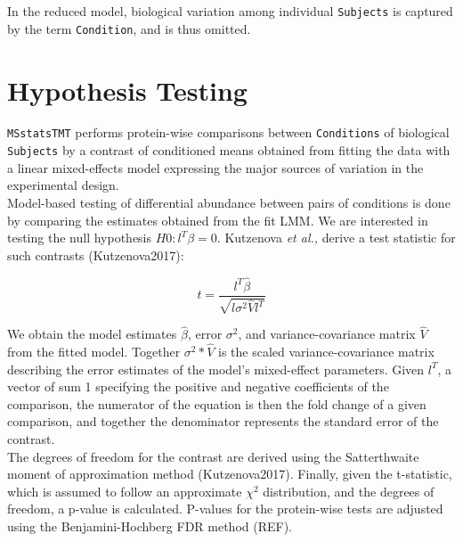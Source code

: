 \documentclass[11pt]{elife}\usepackage[]{graphicx}\usepackage[]{color}
\begin{document}
In the reduced model, biological variation among individual \texttt{Subjects} is 
captured by the term \texttt{Condition}, and is thus omitted.\\


\section{Hypothesis Testing}

\texttt{MSstatsTMT} performs protein-wise
comparisons between \texttt{Conditions} of biological \texttt{Subjects} by 
a contrast of conditioned means obtained from fitting the data with a
linear mixed-effects model expressing the major sources of variation in the
experimental design.\\

Model-based testing of differential abundance between pairs of conditions
is done by comparing the estimates obtained from the fit LMM. We are interested 
in testing the null hypothesis $H0 : l^T\beta = 0$. Kutzenova \textit{et al.,}
derive a test statistic for such contrasts (Kutzenova2017):

\begin{equation}
	t = \frac{l^T \hat{\beta}}{\sqrt{l \sigma^2 \hat{V} l^T}}
\end{equation}

We obtain the model estimates $\hat{\beta}$, 
error $\sigma^2$, and
variance-covariance matrix $\hat{V}$ from the fitted model. 
Together $\sigma^2 * \hat{V}$ is the scaled variance-covariance matrix
describing the error estimates of the model's mixed-effect parameters. 
Given $l^T$, a vector of sum 1 specifying the positive and negative
coefficients of the comparison, the numerator of the equation is then
the fold change of a given comparison, and together the denominator 
represents the standard error of the contrast.\\

The degrees of freedom for the contrast are derived using the Satterthwaite
moment of approximation method (Kutzenova2017).
Finally, given the t-statistic, which is assumed to follow an approximate
$\chi^2$ distribution, and the degrees of freedom, a p-value is calculated. 
P-values for the protein-wise tests are adjusted using the
Benjamini-Hochberg FDR method (REF).\\
\end{document}
